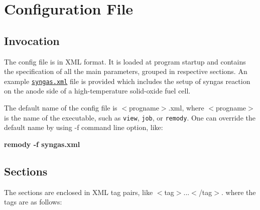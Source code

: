 \hypertarget{Configfile_SecConfig}{}\section{Configuration File}\label{Configfile_SecConfig}
\hypertarget{Configfile_SSecInvocation}{}\subsection{Invocation}\label{Configfile_SSecInvocation}
The config file is in XML format. It is loaded at program startup and contains the specification of all the main parameters, grouped in respective sections. An example \href{../syngas.xml}{\tt syngas.xml} file is provided which includes the setup of syngas reaction on the anode side of a high-temperature solid-oxide fuel cell.

The default name of the config file is $<$progname$>$.xml, where $<$progname$>$ is the name of the executable, such as {\tt view}, {\tt job}, or {\tt remody}. One can override the default name by using -f command line option, like: \par
\par
{\bf  remody -f syngas.xml }\par
\par
\hypertarget{Configfile_SSecSections}{}\subsection{Sections}\label{Configfile_SSecSections}
The sections are enclosed in XML tag pairs, like $<$tag$>$...$<$/tag$>$. where the tags are as follows:

